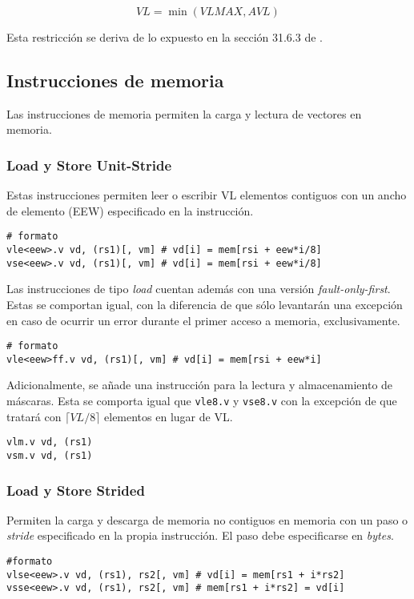 $$VL = \min(VLMAX, AVL)$$

Esta restricción se deriva de lo expuesto en la sección 31.6.3 de \cite{riscv-isa2024}.

\subsection{Instrucciones de memoria}
Las instrucciones de memoria permiten la carga y lectura de vectores en memoria.

\subsubsection{Load y Store Unit-Stride}
Estas instrucciones permiten leer o escribir VL elementos contiguos con un
ancho de elemento (EEW)  especificado en la instrucción.

\begin{lstlisting}
# formato
vle<eew>.v vd, (rs1)[, vm] # vd[i] = mem[rsi + eew*i/8]
vse<eew>.v vd, (rs1)[, vm] # vd[i] = mem[rsi + eew*i/8]
\end{lstlisting}

Las instrucciones de tipo \textit{load} cuentan además con una versión
\textit{fault-only-first}. Estas se comportan igual, con la diferencia de que
sólo levantarán una excepción en caso de ocurrir un error durante el primer
acceso a memoria, exclusivamente.

\begin{lstlisting}
# formato
vle<eew>ff.v vd, (rs1)[, vm] # vd[i] = mem[rsi + eew*i]
\end{lstlisting}

Adicionalmente, se añade una instrucción para la lectura y almacenamiento de
máscaras. Esta se comporta igual que \texttt{vle8.v} y \texttt{vse8.v} con la
excepción de que tratará con $\lceil VL / 8\rceil$ elementos en lugar de VL.

\begin{lstlisting}
vlm.v vd, (rs1)
vsm.v vd, (rs1)
\end{lstlisting}

\subsubsection{Load y Store Strided}
Permiten la carga y descarga de memoria no contiguos en memoria con un paso o
\textit{stride} especificado en la propia instrucción. El paso debe
especificarse en \textit{bytes}.

\begin{lstlisting}
#formato
vlse<eew>.v vd, (rs1), rs2[, vm] # vd[i] = mem[rs1 + i*rs2]
vsse<eew>.v vd, (rs1), rs2[, vm] # mem[rs1 + i*rs2] = vd[i]
\end{lstlisting}

